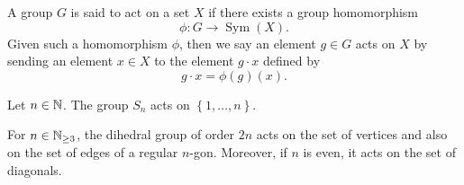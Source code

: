 \begin{definition}
    A group $G$ is said to act on a set $X$ if there exists a group homomorphism
    $$
    \phi: G \rightarrow \operatorname{Sym}(X).
    $$
    Given such a homomorphism $\phi$, then we say an element $g \in G$ acts on $X$ by sending an element $x \in X$ to the element $g \cdot x$ defined by
    $$
    g \cdot x=\phi(g)(x).
    $$
\end{definition}

\begin{example}
  Let $n\in\mathbb N$. The group $S_n$ acts on $\left\{ 1,\ldots, n \right\}$.

  For $n\in\mathbb N_{\geq 3}$, the dihedral group of order $2n$ acts on the set of vertices and
  also on the set of edges of a regular $n$-gon. Moreover, if $n$ is even, it acts on the set of diagonals.
\end{example}

